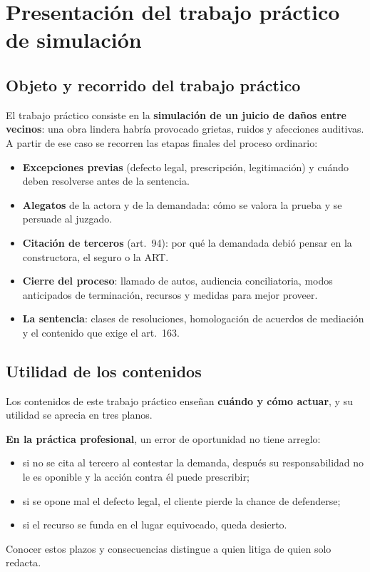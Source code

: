 \documentclass[12pt,oneside]{book}
\begin{document}
\chapter[Presentaci\'on del trabajo pr\'actico]{Presentaci\'on del trabajo pr\'actico de simulaci\'on}

\section{Objeto y recorrido del trabajo pr\'actico}

El trabajo pr\'actico consiste en la \textbf{simulaci\'on de un juicio de da\~nos entre vecinos}: una obra lindera habr\'ia provocado grietas, ruidos y afecciones auditivas. A partir de ese caso se recorren las etapas finales del proceso ordinario:

\begin{itemize}
    \item \textbf{Excepciones previas} (defecto legal, prescripci\'on, legitimaci\'on) y cu\'ando deben resolverse antes de la sentencia.
    \item \textbf{Alegatos} de la actora y de la demandada: c\'omo se valora la prueba y se persuade al juzgado.
    \item \textbf{Citaci\'on de terceros} (art.~94): por qu\'e la demandada debi\'o pensar en la constructora, el seguro o la ART.
    \item \textbf{Cierre del proceso}: llamado de autos, audiencia conciliatoria, modos anticipados de terminaci\'on, recursos y medidas para mejor proveer.
    \item \textbf{La sentencia}: clases de resoluciones, homologaci\'on de acuerdos de mediaci\'on y el contenido que exige el art.~163.
\end{itemize}

\section{Utilidad de los contenidos}

Los contenidos de este trabajo pr\'actico ense\~nan \textbf{cu\'ando y c\'omo actuar}, y su utilidad se aprecia en tres planos.

\textbf{En la pr\'actica profesional}, un error de oportunidad no tiene arreglo:
\begin{itemize}
    \item si no se cita al tercero al contestar la demanda, despu\'es su responsabilidad no le es oponible y la acci\'on contra \'el puede prescribir;
    \item si se opone mal el defecto legal, el cliente pierde la chance de defenderse;
    \item si el recurso se funda en el lugar equivocado, queda desierto.
\end{itemize}
Conocer estos plazos y consecuencias distingue a quien litiga de quien solo redacta.
\end{document}
